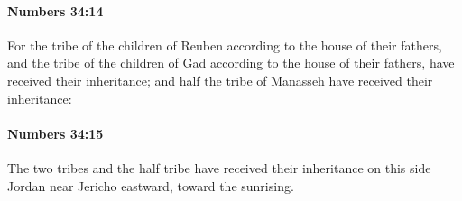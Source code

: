 		\paragraph{Numbers 34:14} %
			\label{NUMBERS-34-14}

			For the tribe of the children of Reuben according to the house of their fathers, and the tribe of the children of Gad according to the house of their fathers, have received their inheritance; and half the tribe of Manasseh have received their inheritance:


		\paragraph{Numbers 34:15} %
			\label{NUMBERS-34-15}

			The two tribes and the half tribe have received their inheritance on this side Jordan near Jericho eastward, toward the sunrising.

